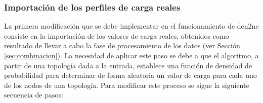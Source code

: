 \subsubsection{Importación de los perfiles de carga reales}
\label{sec:importcarga}

La primera modificación que se debe implementar en el funcionamiento de \gls{den2ne} consiste en la importación de los valores de carga reales, obtenidos como resultado de llevar a cabo la fase de procesamiento de los datos (ver Sección \ref{sec:combinacion}). La necesidad de aplicar este paso se debe a que el algoritmo, a partir de una topología dada a la entrada, establece una función de densidad de probabilidad para determinar de forma aleatoria un valor de carga para cada uno de los nodos de una topología. Para modificar este proceso se sigue la siguiente secuencia de pasos:


